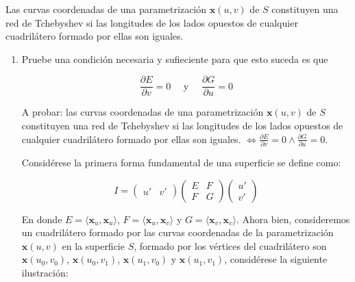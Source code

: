 \begin{problema}
    Las curvas coordenadas de una parametrización $\mathbf{x}(u, v)$ de $S$ constituyen una red de Tchebyshev si las longitudes de los lados opuestos de cualquier cuadrilátero formado por ellas son iguales.

    \begin{enumerate}
        \item Pruebe una condición necesaria y sufieciente para que esto suceda es que

        $$
        \frac{\partial E}{\partial v}=0 \quad \text { y } \quad \frac{\partial G}{\partial u}=0
        $$
        \begin{dem}
            A probar: las curvas coordenadas de una parametrización $\mathbf{x}(u, v)$ de $S$ constituyen una red de Tchebyshev si las longitudes de los lados opuestos de cualquier cuadrilátero formado por ellas son iguales. $\iff \frac{\partial E}{\partial v}=0 \wedge \frac{\partial G}{\partial u}=0$.

Considérese la primera forma fundamental de una superficie se define como:

$$I= \begin{pmatrix}
    u' & v'
\end{pmatrix}\begin{pmatrix}
    E & F\\
    F & G
\end{pmatrix} \begin{pmatrix}
    u'\\
    v'
\end{pmatrix}$$


En donde $E = \langle \mathbf{x}_u,\mathbf{x}_u \rangle$, $F = \langle \mathbf{x}_u,\mathbf{x}_v \rangle$ y $G = \langle \mathbf{x}_v,\mathbf{x}_v \rangle$. Ahora bien, consideremos un cuadrilátero formado por las curvas coordenadas de la parametrización $\mathbf{x}(u, v)$ en la superficie $S$, formado por los vértices del cuadrilátero son $\mathbf{x}(u_0,v_0)$, $\mathbf{x}(u_0,v_1)$, $\mathbf{x}(u_1,v_0)$ y $\mathbf{x}(u_1,v_1)$, considérese la siguiente ilustración:

\begin{figure}[H]
    \centering
\end{figure}
\end{dem}
\end{enumerate}
\end{problema}
